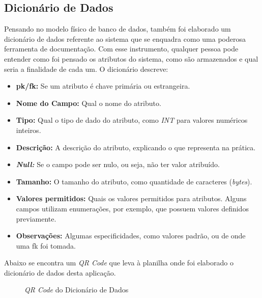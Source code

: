 \subsection{Dicionário de Dados}
Pensando no modelo físico de banco de dados, também foi elaborado um dicionário de dados referente ao sistema que se enquadra como uma poderosa ferramenta de documentação. Com esse instrumento, qualquer pessoa pode entender como foi pensado os atributos do sistema, como são armazenados e qual seria a finalidade de cada um.
O dicionário descreve:
\begin{itemize}
	\item \textbf{\gls{pk}/\gls{fk}:} Se um atributo é chave primária ou estrangeira.
	\item \textbf{Nome do Campo:} Qual o nome do atributo.
	\item \textbf{Tipo:} Qual o tipo de dado do atributo, como \textit{INT} para valores numéricos inteiros.
	\item \textbf{Descrição:} A descrição do atributo, explicando o que representa na prática.
	\item \textbf{\textit{Null:}} Se o campo pode ser nulo, ou seja, não ter valor atribuído.
	\item \textbf{Tamanho:} O tamanho do atributo, como quantidade de caracteres (\textit{bytes}).
	\item \textbf{Valores permitidos:} Quais os valores permitidos para atributos. Alguns campos utilizam enumerações, por exemplo, que possuem valores definidos previamente.
	\item \textbf{Observações:} Algumas especificidades, como valores padrão, ou de onde uma \gls{fk} foi tomada.
\end{itemize}
Abaixo se encontra um \textit{QR Code} que leva à planilha onde foi elaborado o dicionário de dados desta aplicação.
\begin{figure}[h]
	\centering
	\caption{\emph{QR Code} do Dicionário de Dados}
	\label{fig:qrcode-dicionario-de-dados}
\end{figure}





